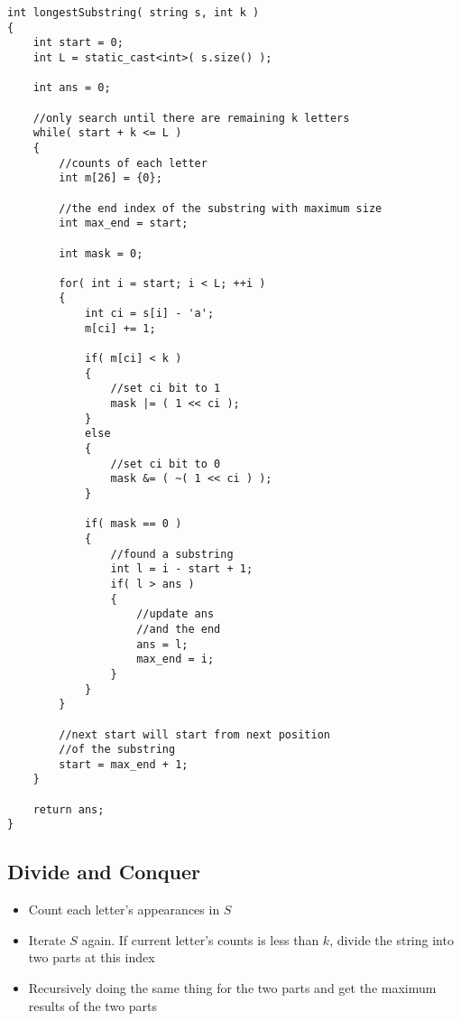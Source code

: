 \setcounter{lstlisting}{0}
\begin{lstlisting}[style=customc, caption={Mask With Hash Map}]
int longestSubstring( string s, int k )
{
    int start = 0;
    int L = static_cast<int>( s.size() );

    int ans = 0;

    //only search until there are remaining k letters
    while( start + k <= L )
    {
        //counts of each letter
        int m[26] = {0};

        //the end index of the substring with maximum size
        int max_end = start;

        int mask = 0;

        for( int i = start; i < L; ++i )
        {
            int ci = s[i] - 'a';
            m[ci] += 1;

            if( m[ci] < k )
            {
                //set ci bit to 1
                mask |= ( 1 << ci );
            }
            else
            {
                //set ci bit to 0
                mask &= ( ~( 1 << ci ) );
            }

            if( mask == 0 )
            {
                //found a substring
                int l = i - start + 1;
                if( l > ans )
                {
                    //update ans
                    //and the end
                    ans = l;
                    max_end = i;
                }
            }
        }

        //next start will start from next position
        //of the substring
        start = max_end + 1;
    }

    return ans;
}
\end{lstlisting}

\subsection{Divide and Conquer}
\begin{itemize}
\item Count each letter's appearances in $S$
\item Iterate $S$ again. If current letter's counts is less than $k$, divide the string into two parts at this index
\item Recursively doing the same thing for the two parts and get the maximum results of the two parts
\end{itemize}

